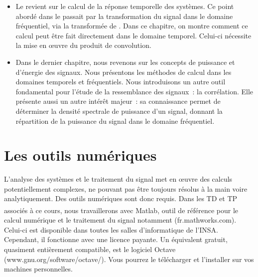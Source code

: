 \begin{itemize}
		\item Le  revient sur le calcul de la réponse temporelle des systèmes. Ce point abordé dans le  passait par la transformation du signal dans le domaine fréquentiel, via la transformée de \Laplace{}. Dans ce chapitre, on montre comment ce calcul peut être fait directement dans le domaine temporel. Celui-ci nécessite la mise en œuvre du produit de convolution. 
		\item Dans le dernier chapitre, nous revenons sur les concepts de puissance et d'énergie des signaux. Nous présentons les méthodes de calcul dans les domaines temporels et fréquentiels. Nous introduisons un autre outil fondamental pour l'étude de la ressemblance des signaux~: la corrélation. Elle présente aussi un autre intérêt majeur~: sa connaissance permet de déterminer la densité spectrale de puissance d'un signal, donnant la répartition de la puissance du signal dans le domaine fréquentiel.
	\end{itemize}
	
	
	\section{Les outils numériques}
	L'analyse des systèmes et le traitement du signal met en œuvre des calculs potentiellement complexes, ne pouvant pas être toujours résolus à la main voire analytiquement. Des outils numériques sont donc requis.
	Dans les TD et TP associés à ce cours, nous travaillerons avec Matlab\textsuperscript{\textregistered}, outil de référence pour le calcul numérique et le traitement du signal notamment (fr.mathworks.com). Celui-ci est disponible dans toutes les salles d'informatique de l'INSA. Cependant, il fonctionne avec une licence payante. Un équivalent gratuit, quasiment entièrement compatible, est le logiciel Octave (www.gnu.org/software/octave/). Vous pourrez le télécharger et l'installer sur vos machines personnelles.
	